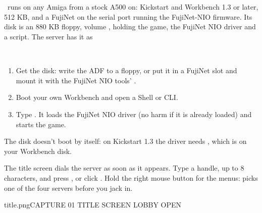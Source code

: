 \documentclass[12pt,letterpaper]{article}
\begin{document}
\chapter{}
\begin{sloppypar}
\game\ runs on any Amiga from a stock A500 on: Kickstart and Workbench 1.3 or later, 512 KB, and a FujiNet on the
serial port running the FujiNet-NIO firmware. Its disk is an 880 KB floppy, volume , holding the
game, the FujiNet NIO driver and a  script. The server has it as
\end{sloppypar}
\begin{center}\\\end{center}
\begin{enumerate}[nosep]
  \item Get the disk: write the ADF to a floppy, or put it in a FujiNet slot and mount it with the FujiNet NIO
    tools' .
  \item Boot your own Workbench and open a Shell or CLI.
  \item Type . It loads the FujiNet NIO driver (no harm if it is already loaded) and
    starts the game.
\end{enumerate}
The disk doesn't boot by itself: on Kickstart 1.3 the driver needs , which is on your Workbench
disk.

\begin{sloppypar}
The title screen dials the server as soon as it appears. Type a handle, up to 8 characters, and press
, or click . Hold the right mouse button for the menus:  picks one of the
four servers before you jack in.
\end{sloppypar}

\begin{capture}{title.png}{CAPTURE 01 \quad TITLE SCREEN \quad LOBBY OPEN}
\end{capture}

\begin{legend}
\end{legend}
\end{document}
